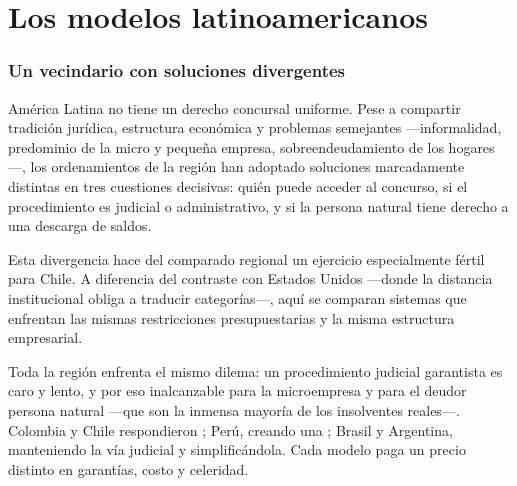 \chapter{Los modelos latinoamericanos}
\label{cap:comparado-latam}


\bloqueTeorico

\subsection{Un vecindario con soluciones divergentes}

América Latina no tiene un derecho concursal uniforme. Pese a compartir tradición jurídica,
estructura económica y problemas semejantes ---informalidad, predominio de la micro y pequeña
empresa, sobreendeudamiento de los hogares---, los ordenamientos de la región han adoptado
soluciones marcadamente distintas en tres cuestiones decisivas: quién puede acceder al concurso, si
el procedimiento es judicial o administrativo, y si la persona natural tiene derecho a una descarga
de saldos.

Esta divergencia hace del comparado regional un ejercicio especialmente fértil para Chile. A
diferencia del contraste con Estados Unidos ---donde la distancia institucional obliga a traducir
categorías---, aquí se comparan sistemas que enfrentan las mismas restricciones presupuestarias y
la misma estructura empresarial.

\begin{foco}
Toda la región enfrenta el mismo dilema: un procedimiento judicial garantista es caro y lento, y
por eso inalcanzable para la microempresa y para el deudor persona natural ---que son la inmensa
mayoría de los insolventes reales---. Colombia y Chile respondieron
; Perú, creando una ;
Brasil y Argentina, manteniendo la vía judicial y simplificándola. Cada modelo paga un precio
distinto en garantías, costo y celeridad.
\end{foco}


